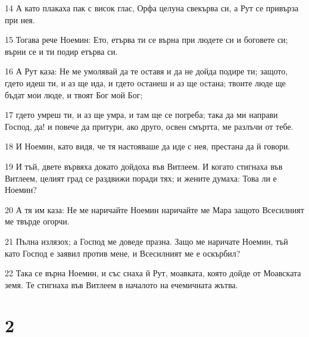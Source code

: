 \par 14 А като плакаха пак с висок глас, Орфа целуна свекърва си, а Рут се привърза при нея.
\par 15 Тогава рече Ноемин: Ето, етърва ти се върна при людете си и боговете си; върни се и ти подир етърва си.
\par 16 А Рут каза: Не ме умолявай да те оставя и да не дойда подире ти; защото, гдето идеш ти, и аз ще ида, и гдето останеш и аз ще остана; твоите люде ще бъдат мои люде, и твоят Бог мой Бог;
\par 17 гдето умреш ти, и аз ще умра, и там ще се погреба; така да ми направи Господ, да! и повече да притури, ако друго, освен смъртта, ме разлъчи от тебе.
\par 18 И Ноемин, като видя, че тя настояваше да иде с нея, престана да й говори.
\par 19 И тъй, двете вървяха докато дойдоха във Витлеем. И когато стигнаха във Витлеем, целият град се раздвижи поради тях; и жените думаха: Това ли е Ноемин?
\par 20 А тя им каза: Не ме наричайте Ноемин наричайте ме Мара защото Всесилният ме твърде огорчи.
\par 21 Пълна излязох; а Господ ме доведе празна. Защо ме наричате Ноемин, тъй като Господ е заявил против мене, и Всесилният ме е оскърбил?
\par 22 Така се върна Ноемин, и със снаха й Рут, моавката, която дойде от Моавската земя. Те стигнаха във Витлеем в началото на ечемичната жътва.

\chapter{2}

